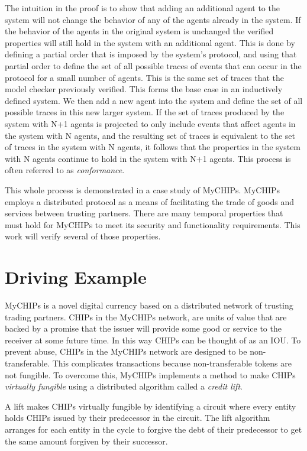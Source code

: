 \documentclass[article, onecolumn, 12pt]{IEEEtran}
\begin{document}
The intuition in the proof is to show that adding an additional agent to the system will not change the behavior of any of the agents already in the system. If the behavior of the agents in the original system is unchanged the verified properties will still hold in the system with an additional agent.
This is done by defining a partial order that is imposed by the system's protocol, and using that partial order to define the set of all possible traces of events that can occur in the protocol for a small number of agents. This is the same set of traces that the model checker previously verified. This forms the base case in an inductively defined system. We then add a new agent into the system and define the set of all possible traces in this new larger system. If the set of traces produced by the system with N+1 agents is projected to only include events that affect agents in the system with N agents, and the resulting set of traces is equivalent to the set of traces in the system with N agents, it follows that the properties in the system with N agents continue to hold in the system with N+1 agents. This process is often referred to as \emph{conformance}. 

This whole process is demonstrated in a case study of MyCHIPs. MyCHIPs employs a distributed protocol as a means of facilitating the trade of goods and services between trusting partners. There are many temporal properties that must hold for MyCHIPs to meet its security and functionality requirements. This work will verify several of those properties.

\section{Driving Example}

MyCHIPs is a novel digital currency based on a distributed network of trusting trading partners. CHIPs in the MyCHIPs network, are units of value that are backed by a promise that the issuer will provide some good or service to the receiver at some future time. In this way CHIPs can be thought of as an IOU. To prevent abuse, CHIPs in the MyCHIPs network are designed to be non-transferable. This complicates transactions because non-transferable tokens are not fungible. To overcome this, MyCHIPs implements a method to make CHIPs \emph{virtually fungible} using a distributed algorithm called a \emph{credit lift}. \cite{bateman_myCHIPs}

A lift makes CHIPs virtually fungible by identifying a circuit where every entity holds CHIPs issued by their predecessor in the circuit. The lift algorithm arranges for each entity in the cycle to forgive the debt of their predecessor to get the same amount forgiven by their successor. 
 
\end{document}
